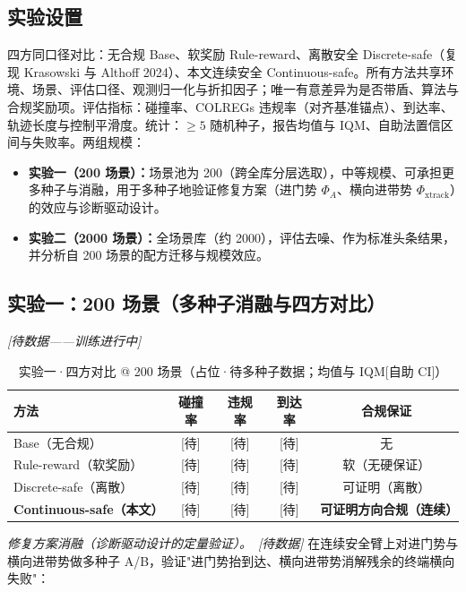 \documentclass[12pt,letterpaper]{article}
\begin{document}
\subsection{实验设置}
四方同口径对比：无合规 Base、软奖励 Rule-reward、离散安全 Discrete-safe（复现 Krasowski 与 Althoff 2024）、本文连续安全 Continuous-safe。所有方法共享环境、场景、评估口径、观测归一化与折扣因子；唯一有意差异为是否带盾、算法与合规奖励项。评估指标：碰撞率、COLREGs 违规率（对齐基准锚点）、到达率、轨迹长度与控制平滑度。统计：$\ge 5$ 随机种子，报告均值与 IQM、自助法置信区间与失败率。两组规模：
\begin{itemize}
  \item \textbf{实验一（200 场景）：}场景池为 200（跨全库分层选取），中等规模、可承担更多种子与消融，用于多种子地验证修复方案（进门势 $\Phi_A$、横向进带势 $\Phi_{\text{xtrack}}$）的效应与诊断驱动设计。
  \item \textbf{实验二（2000 场景）：}全场景库（约 2000），评估去噪、作为标准头条结果，并分析自 200 场景的配方迁移与规模效应。
\end{itemize}

\subsection{实验一：200 场景（多种子消融与四方对比）}
\textit{[待数据——训练进行中]}

\begin{table}[h]
  \caption{实验一·四方对比 @ 200 场景（占位·待多种子数据；均值与 IQM[自助 CI]）}
  \label{tab:main200}
  \centering
  \begin{tabular}{lcccc}
    \toprule
    \textbf{方法} & \textbf{碰撞率} & \textbf{违规率} & \textbf{到达率} & \textbf{合规保证} \\
    \midrule
    Base（无合规）        & [待] & [待] & [待] & 无 \\
    Rule-reward（软奖励）  & [待] & [待] & [待] & 软（无硬保证） \\
    Discrete-safe（离散）  & [待] & [待] & [待] & 可证明（离散） \\
    \textbf{Continuous-safe（本文）} & [待] & [待] & [待] & \textbf{可证明方向合规（连续）} \\
    \bottomrule
  \end{tabular}
\end{table}

\textit{修复方案消融（诊断驱动设计的定量验证）。}\ \textit{[待数据]} 在连续安全臂上对进门势与横向进带势做多种子 A/B，验证"进门势抬到达、横向进带势消解残余的终端横向失败"：
\end{document}

